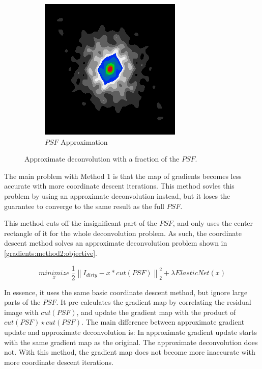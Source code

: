 \begin{figure}[h]
\begin{subfigure}[b]{0.3\linewidth}
		\includegraphics[width=\linewidth]{./chapters/03.distribution/simulated/psf.png}
		\caption{$PSF$ Approximation}
	\end{subfigure}
	
	\caption{Approximate deconvolution with a fraction of the $PSF$.}
\end{figure} 
The main problem with Method 1 is that the map of gradients becomes less accurate with more coordinate descent iterations. This method sovles this problem by using an approximate deconvolution instead, but it loses the guarantee to converge to the same result as the full $PSF$.

This method cuts off the insignificant part of the $PSF$, and only uses the center rectangle of it for the whole deconvolution problem. As such, the coordinate descent method solves an approximate deconvolution problem shown in \eqref{gradients:method2:objective}.

\begin{equation}\label{gradients:method2:objective}
\underset{x}{minimize} \: \frac{1}{2} \left \| I_{dirty} - x * cut(PSF) \right \|_2^2 + \lambda ElasticNet(x)
\end{equation}

In essence, it uses the same basic coordinate descent method, but ignore large parts of the $PSF$. It pre-calculates the gradient map by correlating the residual image with $cut(PSF)$, and update the gradient map with the product of $cut(PSF) \star cut(PSF)$. The main difference between approximate gradient update and approximate deconvolution is: In approximate gradient update starts with the same gradient map as the original. The approximate deconvolution does not. With this method, the gradient map does not become more inaccurate with more coordinate descent iterations.

